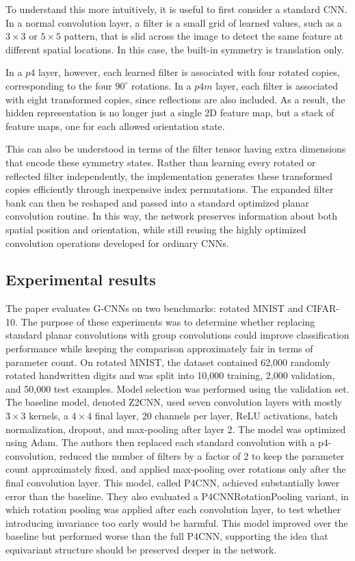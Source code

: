 \documentclass{article}
\begin{document}
To understand this more intuitively, it is useful to first consider a standard CNN. In a normal convolution layer, a filter is a small grid of learned values, such as a \(3\times3\) or \(5\times5\) pattern, that is slid across the image to detect the same feature at different spatial locations. In this case, the built-in symmetry is translation only.

In a \(p4\) layer, however, each learned filter is associated with four rotated copies, corresponding to the four \(90^\circ\) rotations. In a \(p4m\) layer, each filter is associated with eight transformed copies, since reflections are also included. As a result, the hidden representation is no longer just a single 2D feature map, but a stack of feature maps, one for each allowed orientation state.

This can also be understood in terms of the filter tensor having extra dimensions that encode these symmetry states. Rather than learning every rotated or reflected filter independently, the implementation generates these transformed copies efficiently through inexpensive index permutations. The expanded filter bank can then be reshaped and passed into a standard optimized planar convolution routine. In this way, the network preserves information about both spatial position and orientation, while still reusing the highly optimized convolution operations developed for ordinary CNNs.

\subsection{Experimental results}

The paper evaluates G-CNNs on two benchmarks: rotated MNIST and CIFAR-10. The purpose of these experiments was to determine whether replacing standard planar convolutions with group convolutions could improve classification performance while keeping the comparison approximately fair in terms of parameter count. On rotated MNIST, the dataset contained 62{,}000 randomly rotated handwritten digits and was split into 10{,}000 training, 2{,}000 validation, and 50{,}000 test examples. Model selection was performed using the validation set. The baseline model, denoted Z2CNN, used seven convolution layers with mostly \(3\times3\) kernels, a \(4\times4\) final layer, 20 channels per layer, ReLU activations, batch normalization, dropout, and max-pooling after layer 2. The model was optimized using Adam. The authors then replaced each standard convolution with a p4-convolution, reduced the number of filters by a factor of 2 to keep the parameter count approximately fixed, and applied max-pooling over rotations only after the final convolution layer. This model, called P4CNN, achieved substantially lower error than the baseline. They also evaluated a P4CNNRotationPooling variant, in which rotation pooling was applied after each convolution layer, to test whether introducing invariance too early would be harmful. This model improved over the baseline but performed worse than the full P4CNN, supporting the idea that equivariant structure should be preserved deeper in the network.
\end{document}
